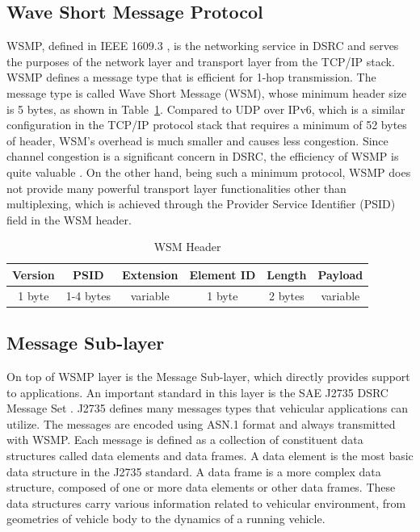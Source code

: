 \documentclass[12pt]{report}
\begin{document}
\subsection{Wave Short Message Protocol}
WSMP, defined in IEEE 1609.3 \cite{ieee16093}, is the networking service in DSRC and serves the purposes of the network layer and transport layer from the TCP/IP stack. WSMP defines a message type that is efficient for 1-hop transmission. The message type is called Wave Short Message (WSM), whose minimum header size is 5 bytes, as shown in Table~\ref{tab:wsm}. Compared to UDP over IPv6, which is a similar configuration in the TCP/IP protocol stack that requires a minimum of 52 bytes of header, WSM's overhead is much smaller and causes less congestion. Since channel congestion is a significant concern in DSRC, the efficiency of WSMP is quite valuable \cite{kenney2011}. On the other hand, being such a minimum protocol, WSMP does not provide many powerful transport layer functionalities other than multiplexing, which is achieved through the Provider Service Identifier (PSID) field in the WSM header.

\begin{table}[h]
  \begin{center}
    \begin{tabular}{|c|c|c|c|c|c|}
      \hline
      Version & PSID      & Extension   & Element ID & Length  & Payload \\ \hline
      1 byte  & 1-4 bytes & variable    & 1 byte     & 2 bytes & variable \\ \hline
    \end{tabular}
    \caption{\label{tab:wsm}WSM Header}
  \end{center}
\end{table}

\subsection{Message Sub-layer}
On top of WSMP layer is the Message Sub-layer, which directly provides support to applications. An important standard in this layer is the SAE J2735 DSRC Message Set \cite{sae2016j2735}. J2735 defines many messages types that vehicular applications can utilize. The messages are encoded using ASN.1 format and always transmitted with WSMP. Each message is defined as a collection of constituent data structures called data elements and data frames. A data element is the most basic data structure in the J2735 standard. A data frame is a more complex data structure, composed of one or more data elements or other data frames. \cite{kenney2011} These data structures carry various information related to vehicular environment, from geometries of vehicle body to the dynamics of a running vehicle.
\end{document}
